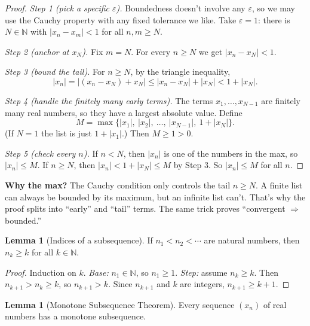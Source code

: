 \documentclass[11pt]{article}
\theoremstyle{definition}
\newtheorem{lem}[defn]{Lemma}
\newcommand{\N}{\mathbb{N}}
\newcommand{\eps}{\varepsilon}
\newcommand{\key}[1]{\textcolor{red!70!black}{\textbf{#1}}}
\begin{document}
\begin{proof}
\emph{Step 1 (pick a specific $\eps$).} Boundedness doesn't involve any
$\eps$, so we may use the Cauchy property with any fixed tolerance we
like. Take $\eps=1$: there is $N\in\N$ with $|x_n-x_m|<1$ for all
$n,m\ge N$.

\emph{Step 2 (anchor at $x_N$).} Fix $m=N$. For every $n\ge N$ we get
$|x_n-x_N|<1$.

\emph{Step 3 (bound the tail).} For $n\ge N$, by the triangle inequality,
\[
|x_n|=|(x_n-x_N)+x_N|\le|x_n-x_N|+|x_N|<1+|x_N|.
\]

\emph{Step 4 (handle the finitely many early terms).} The terms
$x_1,\dots,x_{N-1}$ are finitely many real numbers, so they have a largest
absolute value. Define
\[
M=\max\bigl\{|x_1|,\ |x_2|,\ \dots,\ |x_{N-1}|,\ 1+|x_N|\bigr\}.
\]
(If $N=1$ the list is just $1+|x_1|$.) Then $M\ge1>0$.

\emph{Step 5 (check every $n$).} If $n<N$, then $|x_n|$ is one of the
numbers in the max, so $|x_n|\le M$. If $n\ge N$, then
$|x_n|<1+|x_N|\le M$ by Step 3. So $|x_n|\le M$ for all $n$.
\end{proof}
\noindent\key{Why the max?} The Cauchy condition only controls the tail
$n\ge N$. A finite list can always be bounded by its maximum, but an
infinite list can't. That's why the proof splits into ``early'' and
``tail'' terms. The same trick proves ``convergent $\Rightarrow$
bounded.''

\begin{lem}[Indices of a subsequence]\label{lem:nkk}
If $n_1<n_2<\cdots$ are natural numbers, then $n_k\ge k$ for all
$k\in\N$.
\end{lem}

\begin{proof}
Induction on $k$. \emph{Base:} $n_1\in\N$, so $n_1\ge1$.
\emph{Step:} assume $n_k\ge k$. Then $n_{k+1}>n_k\ge k$, so
$n_{k+1}>k$. Since $n_{k+1}$ and $k$ are integers, $n_{k+1}\ge k+1$.
\end{proof}

\begin{lem}[Monotone Subsequence Theorem]\label{lem:monosub}
Every sequence $(x_n)$ of real numbers has a monotone subsequence.
\end{lem}
\end{document}
